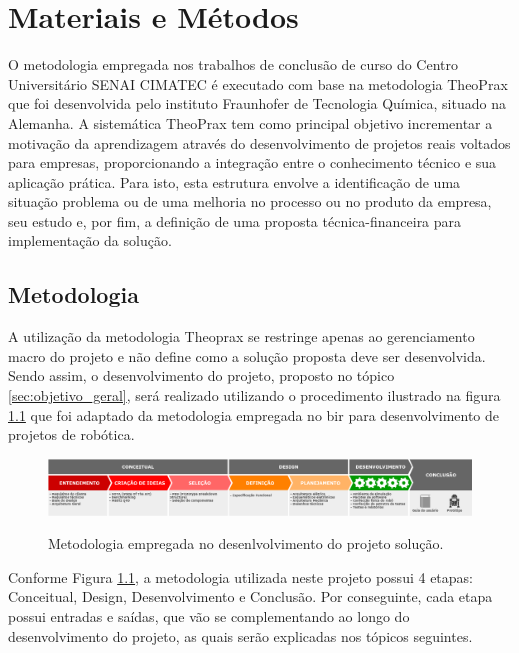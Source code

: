 \chapter{Materiais e Métodos}
\label{chap:materiais_metodos}
O metodologia empregada nos trabalhos de conclusão de curso do Centro Universitário SENAI CIMATEC é executado com base na metodologia TheoPrax que foi desenvolvida pelo instituto Fraunhofer de Tecnologia Química, situado na Alemanha. A sistemática TheoPrax tem como principal objetivo incrementar a motivação da aprendizagem através do desenvolvimento de projetos reais voltados para empresas, proporcionando a integração entre o conhecimento técnico e sua aplicação prática. Para isto, esta estrutura envolve a identificação de uma situação problema ou de uma melhoria no processo ou no produto da empresa, seu estudo e, por fim, a definição de uma proposta técnica-financeira para implementação da solução.

\section{Metodologia}
\label{sec:metodologia}
A utilização da metodologia Theoprax se restringe apenas ao gerenciamento macro do projeto e não define como a solução proposta deve ser desenvolvida. Sendo assim, o desenvolvimento do projeto, proposto no tópico \ref{sec:objetivo_geral}, será realizado utilizando o procedimento ilustrado na figura \ref{fig:metodologia_diagrama} que foi adaptado da metodologia empregada no \gls*{bir} para desenvolvimento de projetos de robótica.

\begin{figure}[H]
	\centering
	\caption{Metodologia empregada no desenlvolvimento do projeto solução.}
	\includegraphics[width=1\textwidth]
	{Figures/metodologia_diagrama}
	\label{fig:metodologia_diagrama}
\end{figure}	

Conforme Figura \ref{fig:metodologia_diagrama}, a metodologia utilizada neste projeto possui 4 etapas: Conceitual, Design, Desenvolvimento e Conclusão. Por conseguinte, cada etapa possui entradas e saídas, que vão se complementando ao longo do desenvolvimento do projeto, as quais serão explicadas nos tópicos seguintes.


